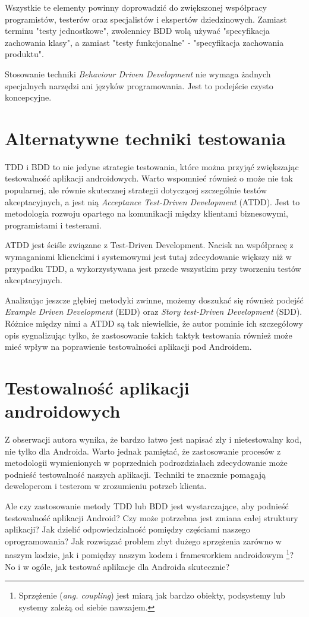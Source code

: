 Wszystkie te elementy powinny doprowadzić do zwiększonej współpracy programistów, testerów oraz specjalistów i ekspertów dziedzinowych. Zamiast terminu "testy jednostkowe", zwolennicy BDD wolą używać "specyfikacja zachowania klasy", a zamiast "testy funkcjonalne" - "specyfikacja zachowania produktu".

Stosowanie techniki \textit{Behaviour Driven Development} nie wymaga żadnych specjalnych narzędzi ani języków programowania. Jest to podejście czysto koncepcyjne.\cite{website:agile:guide}

\section{Alternatywne techniki testowania}
\label{alternatywne_metody_testowania}
TDD i BDD to nie jedyne strategie testowania, które można przyjąć zwiększając testowalność aplikacji androidowych. Warto wspomnieć również o może nie tak popularnej, ale równie skutecznej strategii dotyczącej szczególnie testów akceptacyjnych, a jest nią \textit{Acceptance Test-Driven Development} (ATDD). Jest to metodologia rozwoju opartego na komunikacji między klientami biznesowymi, programistami i testerami. 

ATDD jest ściśle związane z Test-Driven Development. Nacisk na współpracę z wymaganiami klienckimi i systemowymi jest tutaj zdecydowanie większy niż w przypadku TDD, a wykorzystywana jest przede wszystkim przy tworzeniu testów akceptacyjnych.

Analizując jeszcze głębiej metodyki zwinne, możemy doszukać się również podejść \textit{Example Driven Development} (EDD) oraz \textit{Story test-Driven Development} (SDD). Różnice między nimi a ATDD są tak niewielkie, że autor pominie ich szczegółowy opis sygnalizując tylko, że zastosowanie takich taktyk testowania również może mieć wpływ na poprawienie testowalności aplikacji pod Androidem.  

\section{Testowalność aplikacji androidowych}
Z obserwacji autora wynika, że bardzo łatwo jest napisać zły i nietestowalny kod, nie tylko dla Androida. Warto jednak pamiętać, że zastosowanie procesów z metodologii wymienionych w poprzednich podrozdziałach zdecydowanie może podnieść testowalność naszych aplikacji. Techniki te znacznie pomagają deweloperom i testerom w zrozumieniu potrzeb klienta.

Ale czy zastosowanie metody TDD lub BDD jest wystarczające, aby podnieść testowalność aplikacji Android? Czy może potrzebna jest zmiana całej struktury aplikacji? Jak dzielić odpowiedzialność pomiędzy częściami naszego oprogramowania? Jak rozwiązać problem zbyt dużego sprzężenia zarówno w naszym kodzie, jak i pomiędzy naszym kodem i frameworkiem androidowym \footnote{Sprzężenie (\textit{ang. coupling}) jest miarą jak bardzo obiekty, podsystemy lub systemy zależą od siebie nawzajem.}? No i w ogóle, jak testować aplikacje dla Androida skutecznie?

